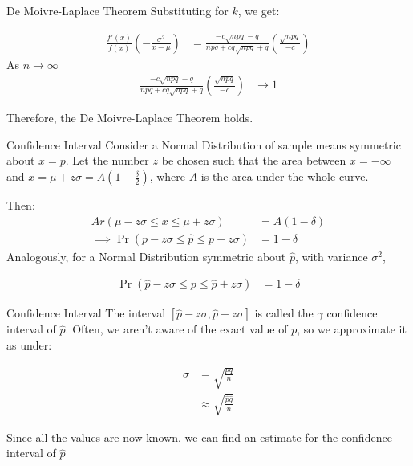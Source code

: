 \documentclass{beamer}
\providecommand{\pr}[1]{\ensuremath{\Pr\left(#1\right)}}
\providecommand{\brak}[1]{\ensuremath{\left(#1\right)}}
\begin{document}
\begin{frame}{De Moivre-Laplace Theorem}
    Substituting for $k$, we get:
    
    \begin{align}
        \frac{f'(x)}{f(x)} \brak{-\frac{\sigma^2}{x-\mu}} &= \frac{-c\sqrt{npq}-q}{npq+cq\sqrt{npq}+q}\brak{\frac{\sqrt{npq}}{-c}}
    \end{align}
    As $n \rightarrow \infty$
    \begin{align}
        \frac{-c\sqrt{npq}-q}{npq+cq\sqrt{npq}+q}\brak{\frac{\sqrt{npq}}{-c}} &\rightarrow 1
    \end{align}
    
    Therefore, the De Moivre-Laplace Theorem holds.
    

\end{frame}

\begin{frame}{Confidence Interval}
    Consider a Normal Distribution of sample means symmetric about $x=p$. Let the number $z$ be chosen such that the area between $x=-\infty$ and $x=\mu + z\sigma = A(1-\frac{\delta}{2})$, where $A$ is the area under the whole curve.
    
    Then: 
    \begin{align}
        Ar(\mu - z\sigma \leq x \leq \mu + z\sigma) &= A(1-\delta) \\
        \implies \pr{p - z\sigma \leq \hat{p} \leq p + z\sigma } &= 1-\delta
    \end{align}
Analogously, for a Normal Distribution symmetric about $\hat{p}$, with variance $\sigma^2$,

\begin{align}
       \pr{\hat{p} - z\sigma \leq p \leq \hat{p} + z\sigma } &= 1-\delta
    \end{align}

\end{frame}

\begin{frame}{Confidence Interval}
    The interval $[\hat{p} - z\sigma,   \hat{p} + z\sigma ]$ is called the  $\gamma$ confidence interval of $\hat{p}$. Often, we aren't aware of the exact value of $p$, so we approximate it as under:
    
    \begin{align}
        \sigma &=  \sqrt{\frac{pq}{n}} \\
        &\approx \sqrt{\frac{\hat{p}\hat{q}}{n}}
    \end{align}

Since all the values are now known, we can find an estimate for the confidence interval of $\hat{p}$

\end{frame}
\end{document}
